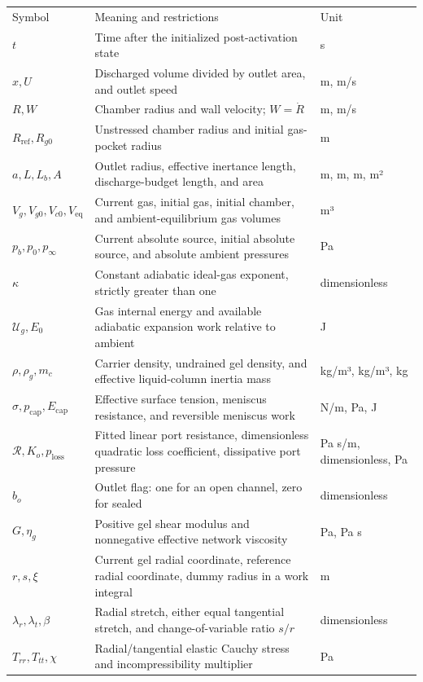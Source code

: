 \documentclass[11pt]{article}
\begin{document}
\begin{longtable}{p{}p{}p{}}
Symbol & Meaning and restrictions & Unit \\
\(t\) & Time after the initialized post-activation state & s \\
\(x,U\) & Discharged volume divided by outlet area, and outlet speed & m, m/s \\
\(R,W\) & Chamber radius and wall velocity; \(W=\dot R\) & m, m/s \\
\(R_{\mathrm{ref}},R_{g0}\) & Unstressed chamber radius and initial gas-pocket radius & m \\
\(a,L,L_b,A\) & Outlet radius, effective inertance length, discharge-budget length, and area & m, m, m, m² \\
\(V_g,V_{g0},V_{c0},V_{\mathrm{eq}}\) & Current gas, initial gas, initial chamber, and ambient-equilibrium gas volumes & m³ \\
\(p_b,p_0,p_\infty\) & Current absolute source, initial absolute source, and absolute ambient pressures & Pa \\
\(\kappa\) & Constant adiabatic ideal-gas exponent, strictly greater than one & dimensionless \\
\(\mathcal U_g,E_0\) & Gas internal energy and available adiabatic expansion work relative to ambient & J \\
\(\rho,\rho_g,m_c\) & Carrier density, undrained gel density, and effective liquid-column inertia mass & kg/m³, kg/m³, kg \\
\(\sigma,p_{\mathrm{cap}},E_{\mathrm{cap}}\) & Effective surface tension, meniscus resistance, and reversible meniscus work & N/m, Pa, J \\
\(\mathcal R,K_o,p_{\mathrm{loss}}\) & Fitted linear port resistance, dimensionless quadratic loss coefficient, dissipative port pressure & Pa s/m, dimensionless, Pa \\
\(b_o\) & Outlet flag: one for an open channel, zero for sealed & dimensionless \\
\(G,\eta_g\) & Positive gel shear modulus and nonnegative effective network viscosity & Pa, Pa s \\
\(r,s,\xi\) & Current gel radial coordinate, reference radial coordinate, dummy radius in a work integral & m \\
\(\lambda_r,\lambda_t,\beta\) & Radial stretch, either equal tangential stretch, and change-of-variable ratio \(s/r\) & dimensionless \\
\(T_{rr},T_{tt},\chi\) & Radial/tangential elastic Cauchy stress and incompressibility multiplier & Pa \\

\end{longtable}
\end{document}
